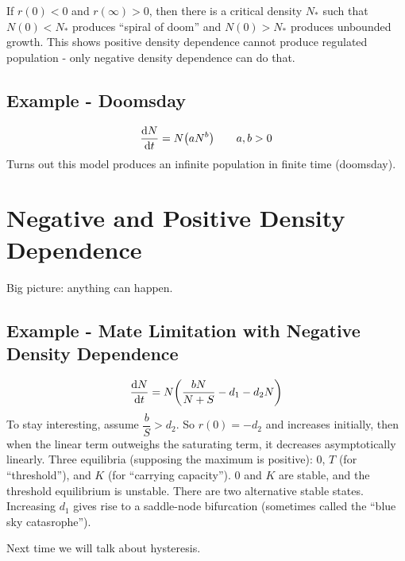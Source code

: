 \documentclass{article}
\begin{document}
            If $r(0) < 0$ and $r(\infty) > 0$, then there is a critical density $N_*$ such that $N(0) < N_*$ produces ``spiral of doom'' and $N(0) > N_*$ produces unbounded growth.  This shows positive density dependence cannot produce regulated population - only negative density dependence can do that.

        \subsection{Example - Doomsday}
            \begin{align}
                \frac{\dd N}{\dd t} = N\qty(a N^b) \qquad a,b > 0
            \end{align}
            Turns out this model produces an infinite population in finite time (doomsday).

    \section{Negative and Positive Density Dependence}
        Big picture: anything can happen.
        \subsection{Example - Mate Limitation with Negative Density Dependence}
            \begin{align}
                \frac{\dd N}{\dd t} = N \qty(\frac{bN}{N + S} - d_1 - d_2 N)
            \end{align}
            To stay interesting, assume $\dfrac{b}{S} > d_2$.  So $r(0) = -d_2$ and increases initially, then when the linear term outweighs the saturating term, it decreases asymptotically linearly.  Three equilibria (supposing the maximum is positive): $0$, $T$ (for ``threshold''), and $K$ (for ``carrying capacity'').  $0$ and $K$ are stable, and the threshold equilibrium is unstable.  There are two alternative stable states.  Increasing $d_1$ gives rise to a saddle-node bifurcation (sometimes called the ``blue sky catasrophe'').

            Next time we will talk about hysteresis.
\end{document}
